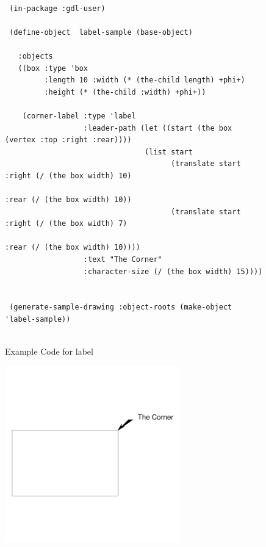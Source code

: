 \documentclass [11pt]{book}
\begin{document}
\begin{itemize}
\begin{figure}
\begin{lrbox}{\boxedverb}
\begin{minipage}{\linewidth}
{\begin{verbatim}        

 (in-package :gdl-user)
                   
 (define-object  label-sample (base-object)
  
   :objects
   ((box :type 'box
         :length 10 :width (* (the-child length) +phi+)
         :height (* (the-child :width) +phi+))
   
    (corner-label :type 'label
                  :leader-path (let ((start (the box (vertex :top :right :rear))))
                                (list start
                                      (translate start :right (/ (the box width) 10)
                                                       :rear (/ (the box width) 10))
                                      (translate start :right (/ (the box width) 7)
                                                       :rear (/ (the box width) 10))))
                  :text "The Corner"
                  :character-size (/ (the box width) 15))))


 (generate-sample-drawing :object-roots (make-object 'label-sample))


\end{verbatim}}
\end{minipage}
\end{lrbox}
\fbox{\usebox{\boxedverb}}

\caption{Example Code for label}

\label{fig:example-code-label}

\end{figure}

\begin{figure}
\begin{center}
\includegraphics[width=3in,height=3in]{../images/example-label.pdf}
\end{center}


\end{figure}
\end{itemize}
\end{document}
